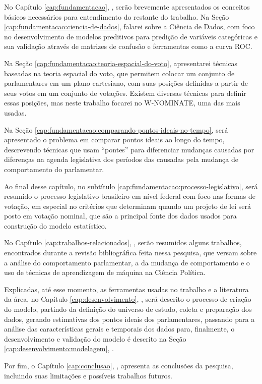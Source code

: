 No Capítulo \ref{cap:fundamentacao}, , serão
brevemente apresentados os conceitos básicos necessários para entendimento do
restante do trabalho. Na Seção \ref{cap:fundamentacao:ciencia-de-dados}, falarei
sobre a Ciência de Dados, com foco no desenvolvimento de modelos preditivos
para predição de variáveis categóricas e sua validação através de matrizes de
confusão e ferramentas como a curva \gls{ROC}.

Na Seção \ref{cap:fundamentacao:teoria-espacial-do-voto}, apresentarei técnicas
baseadas na teoria espacial do voto, que permitem colocar um conjunto de
parlamentares em um plano cartesiano, com suas posições definidas a partir de
seus votos em um conjunto de votações. Existem diversas técnicas para definir
essas posições, mas neste trabalho focarei no W-NOMINATE, uma das mais usadas.

Na Seção \ref{cap:fundamentacao:comparando-pontos-ideais-no-tempo}, será
apresentado o problema em comparar pontos ideais ao longo do tempo, descrevendo
técnicas que usam ``pontes'' para diferenciar mudanças causadas por diferenças
na agenda legislativa dos períodos das causadas pela mudança de comportamento
do parlamentar.

Ao final desse capítulo, no subtítulo
\ref{cap:fundamentacao:processo-legislativo}, será resumido o processo
legislativo brasileiro em nível federal com foco nas formas de votação, em
especial no critérios que determinam quando um projeto de lei será posto em
votação nominal, que são a principal fonte dos dados usados para construção do
modelo estatístico.

No Capítulo \ref{cap:trabalhos-relacionados},
, serão resumidos alguns trabalhos,
encontrados durante a revisão bibliográfica feita nessa pesquisa, que versam
sobre a análise do comportamento parlamentar, a da mudança de comportamento e o
uso de técnicas de aprendizagem de máquina na Ciência Política.

Explicadas, até esse momento, as ferramentas usadas no trabalho e a literatura
da área, no Capítulo \ref{cap:desenvolvimento}, ,
será descrito o processo de criação do modelo, partindo da definição do
universo de estudo, coleta e preparação dos dados, gerando estimativas dos
pontos ideais dos parlamentares, passando para a análise das características
gerais e temporais dos dados para, finalmente, o desenvolvimento e validação do
modelo é descrito na Seção \ref{cap:desenvolvimento:modelagem},
.

Por fim, o Capítulo \ref{cap:conclusao}, , apresenta as
conclusões da pesquisa, incluindo suas limitações e possíveis trabalhos futuros.
